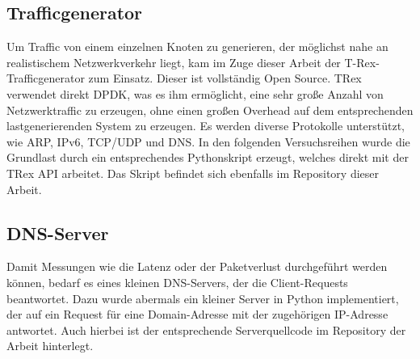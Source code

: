 \subsection{Trafficgenerator}
Um Traffic von einem einzelnen Knoten zu generieren, der möglichst nahe an realistischem Netzwerkverkehr liegt, kam im Zuge dieser Arbeit der T-Rex-Trafficgenerator zum Einsatz. Dieser ist vollständig Open Source. TRex verwendet direkt DPDK, was es ihm ermöglicht, eine sehr große Anzahl von Netzwerktraffic zu erzeugen, ohne einen großen Overhead auf dem entsprechenden lastgenerierenden System zu erzeugen. Es werden diverse Protokolle unterstützt, wie ARP, IPv6, TCP/UDP und DNS. In den folgenden Versuchsreihen wurde die Grundlast durch ein entsprechendes Pythonskript erzeugt, welches direkt mit der TRex API arbeitet. Das Skript befindet sich ebenfalls im Repository dieser Arbeit.
\subsection{DNS-Server}
Damit Messungen wie die Latenz oder der Paketverlust durchgeführt werden können, bedarf es eines kleinen DNS-Servers, der die Client-Requests beantwortet. Dazu wurde abermals ein kleiner Server in Python implementiert, der auf ein Request für eine Domain-Adresse mit der zugehörigen IP-Adresse antwortet. Auch hierbei ist der entsprechende Serverquellcode im Repository der Arbeit hinterlegt.
